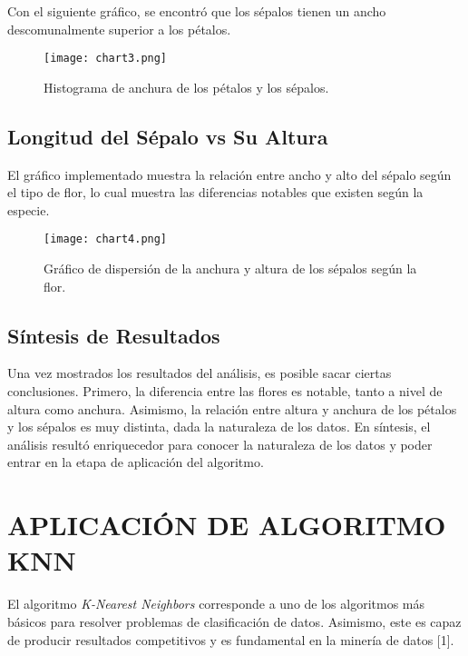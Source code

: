 \documentclass{article_saj}
\begin{document}
\indent

Con el siguiente gráfico, se encontró que los sépalos tienen un ancho descomunalmente superior a los pétalos. 

\begin{figure}[H]
\centerline{\texttt{[image: chart3.png]}}
\caption{Histograma de anchura de los pétalos y los sépalos.}
\label{fig3}
\end{figure}

\subsection{Longitud del Sépalo vs Su Altura}

\indent

El gráfico implementado muestra la relación entre ancho y alto del sépalo según el tipo de flor, lo cual muestra las diferencias notables que existen según la especie.

\begin{figure}[H]
\centerline{\texttt{[image: chart4.png]}}
\caption{Gráfico de dispersión de la anchura y altura de los sépalos según la flor.}
\label{fig4}
\end{figure}

\subsection{Síntesis de Resultados}

\indent

Una vez mostrados los resultados del análisis, es posible sacar ciertas conclusiones. Primero, la diferencia entre las flores es notable, tanto a nivel de altura como anchura. Asimismo, la relación entre altura y anchura de los pétalos y los sépalos es muy distinta, dada la naturaleza de los datos. En síntesis, el análisis resultó enriquecedor para conocer la naturaleza de los datos y poder entrar en la etapa de aplicación del algoritmo.

\section{APLICACIÓN DE ALGORITMO KNN}

\indent

El algoritmo \textit{K-Nearest Neighbors} corresponde a uno de los algoritmos más básicos para resolver problemas de clasificación de datos. Asimismo, este es capaz de producir resultados competitivos y es fundamental en la minería de datos [1]. 
\indent
\end{document}
